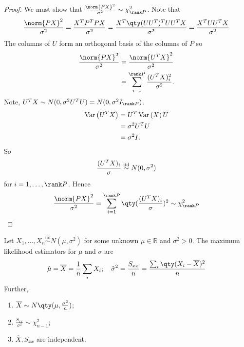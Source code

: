 \begin{proof}
	We must show that $\frac{\norm{PX}^2}{\sigma^2} \sim \chi^2_{\rank P}$.
	Note that
	\begin{align*}
		\frac{\norm{PX}^2}{\sigma^2} = \frac{X^\tran P^\tran P X}{\sigma^2} = \frac{X^\tran \qty(U U^\tran)^\tran U U^\tran X}{\sigma^2} = \frac{X^\tran U U^\tran X}{\sigma^2}
	\end{align*}
	The columns of $U$ form an orthogonal basis of the columns of $P$ so
	\begin{align*}
		\frac{\norm{PX}^2}{\sigma^2} &= \frac{\norm{U^\tran X}^2}{\sigma^2} \\
		&= \sum_{i = 1}^{\rank P} \frac{(U^\tran X)^2_i}{\sigma^2}.
	\end{align*} 
	Note, $U^\tran X \sim N(0,\sigma^2 U^\tran U) = N(0,\sigma^2 I_{\rank P})$.
	\begin{align*}
		\operatorname{Var}\left({U^T X}\right) &= U^T \operatorname{Var}\left({X}\right) U \\
		&= \sigma^2 U^T U \\
		&= \sigma^2 I. 
	\end{align*} 
	So
	\begin{align*}
		\frac{(U^T X)_i}{\sigma} \overset{\text{iid}}{\sim} N(0, \sigma^2)
	\end{align*}
	for $i = 1, \dots, \rank P$.
	Hence
	\begin{align*}
		\frac{\norm{PX}^2}{\sigma^2} = \sum_{i=1}^{\rank P} \qty(\frac{(U^\tran X)_i}{\sigma})^2 \sim \chi^2_{\rank P}
	\end{align*}
\end{proof}

\begin{theorem}
	Let $X_1, \dots, X_n \overset{\text{iid}}{\sim} N(\mu,\sigma^2)$ for some unknown $\mu \in \mathbb R$ and $\sigma^2 > 0$.
	The maximum likelihood estimators for $\mu$ and $\sigma$ are
	\begin{align*}
		\hat \mu = \overline X = \frac{1}{n} \sum_i X_i;\quad \hat \sigma^2 = \frac{S_{xx}}{n} = \frac{\sum_i \qty(X_i - \overline X)^2}{n}
	\end{align*}
	Further,
	\begin{enumerate}
		\item $\overline X \sim N\qty(\mu, \frac{\sigma^2}{n})$;
		\item $\frac{S_{xx}}{\sigma^2} \sim \chi^2_{n-1}$;
		\item $\overline X, S_{xx}$ are independent.
	\end{enumerate}
\end{theorem}

